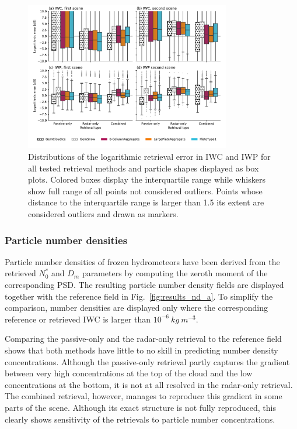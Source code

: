 \documentclass[journal abbreviation, manuscript]{copernicus}
\begin{document}
\begin{figure}[!h]
\centering
\includegraphics[width = 0.8\textwidth]{../plots/results_box}
\caption{Distributions of the logarithmic retrieval error in IWC and IWP for all tested retrieval
  methods and particle shapes displayed as box plots. Colored boxes display the interquartile range
  while whiskers show full range of all points not considered outliers. Points whose distance to
  the interquartile range is larger than 1.5 its extent are considered outliers and drawn as markers.}
\label{fig:boxes}
\end{figure}

\subsubsection{Particle number densities}

Particle number densities of frozen hydrometeors have been derived from the
retrieved $N_0^*$ and $D_m$ parameters by computing the zeroth moment of the
corresponding PSD. The resulting particle number density fields are displayed
together with the reference field in Fig.~\ref{fig:results_nd_a}. To simplify
the comparison, number densities are displayed only where the corresponding
reference or retrieved IWC is larger than $10^{-6}\ \unit{kg\ m^{-3}}$.

Comparing the passive-only and the radar-only retrieval to the reference field
shows that both methods have little to no skill in predicting number density
concentrations. Although the passive-only retrieval partly captures the
gradient between very high concentrations at the top of the cloud and the low
concentrations at the bottom, it is not at all resolved in the radar-only
retrieval. The combined retrieval, however, manages to reproduce this gradient
in some parts of the scene. Although its exact structure is not fully
reproduced, this clearly shows sensitivity of the retrievals to particle number
concentrations.
\end{document}

